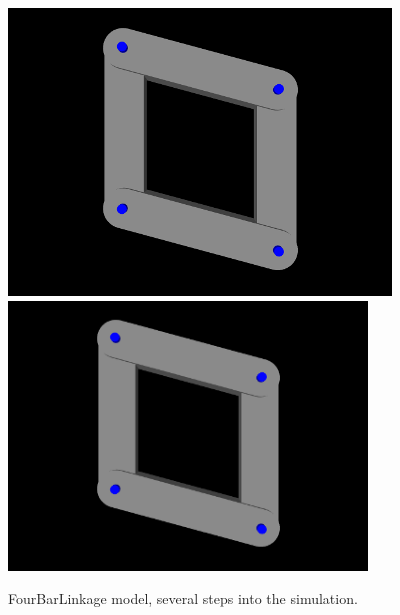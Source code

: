 \begin{figure}[ht]
\begin{center}
\iflatexml
 \includegraphics[]{images/FourBarLinkage}
\else
 \includegraphics[width=3.75in]{images/FourBarLinkage}
\fi
\end{center}
\caption{FourBarLinkage model, several steps into the simulation.}
\label{FourBarLinkage:fig}
\end{figure}

